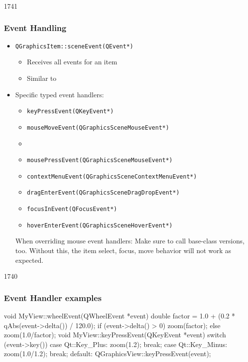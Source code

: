 \begin{slide}{1741}

\frametitle{Event Handling}
\begin{itemize}
\item \texttt{QGraphicsItem::sceneEvent(QEvent*)}
    \begin{itemize}
    \item Receives all events for an item
    \item Similar to 

    \end{itemize} 
\item Specific typed event handlers:
    \begin{itemize}
    \item \texttt{keyPressEvent(QKeyEvent*)}
    \item \texttt{mouseMoveEvent(QGraphicsSceneMouseEvent*)}
    \item {}
    \item \texttt{mousePressEvent(QGraphicsSceneMouseEvent*)}
    \item \texttt{contextMenuEvent(QGraphicsSceneContextMenuEvent*)}
    \item \texttt{dragEnterEvent(QGraphicsSceneDragDropEvent*)}
    \item \texttt{focusInEvent(QFocusEvent*)}
    \item \texttt{hoverEnterEvent(QGraphicsSceneHoverEvent*)}
    \end{itemize}

\begin{block}{When overriding mouse event handlers:}
   Make sure to call base-class versions, too. Without this, the item select, focus, move behavior will not work as expected.
\end{block}
\end{itemize}
\end{slide}


\begin{slide}[fragile]{1740}


\frametitle{Event Handler examples}
\begin{cpp}
void MyView::wheelEvent(QWheelEvent *event) {
    double factor =
        1.0 + (0.2 * qAbs(event->delta()) / 120.0);
    if (event->delta() > 0) zoom(factor);
    else                    zoom(1.0/factor);
}
void MyView::keyPressEvent(QKeyEvent *event) {
    switch (event->key()) {
      case Qt::Key_Plus:
          zoom(1.2);
          break;
      case Qt::Key_Minus:
          zoom(1.0/1.2);
          break;
      default:
          QGraphicsView::keyPressEvent(event);
    }
}
\end{cpp}

\end{slide}


